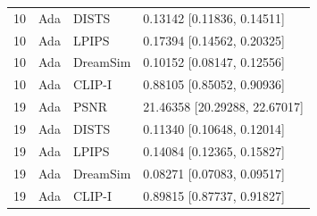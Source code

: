 \documentclass[10pt,letterpaper]{article}
\begin{document}
\begin{longtable}{@{}rlll@{}}
10 & Ada & DISTS & 0.13142 [0.11836, 0.14511]\\
10 & Ada & LPIPS & 0.17394 [0.14562, 0.20325]\\
10 & Ada & DreamSim & 0.10152 [0.08147, 0.12556]\\
10 & Ada & CLIP-I & 0.88105 [0.85052, 0.90936]\\
19 & Ada & PSNR & 21.46358 [20.29288, 22.67017]\\
19 & Ada & DISTS & 0.11340 [0.10648, 0.12014]\\
19 & Ada & LPIPS & 0.14084 [0.12365, 0.15827]\\
19 & Ada & DreamSim & 0.08271 [0.07083, 0.09517]\\
19 & Ada & CLIP-I & 0.89815 [0.87737, 0.91827]\\
\bottomrule\end{longtable}
\end{document}

